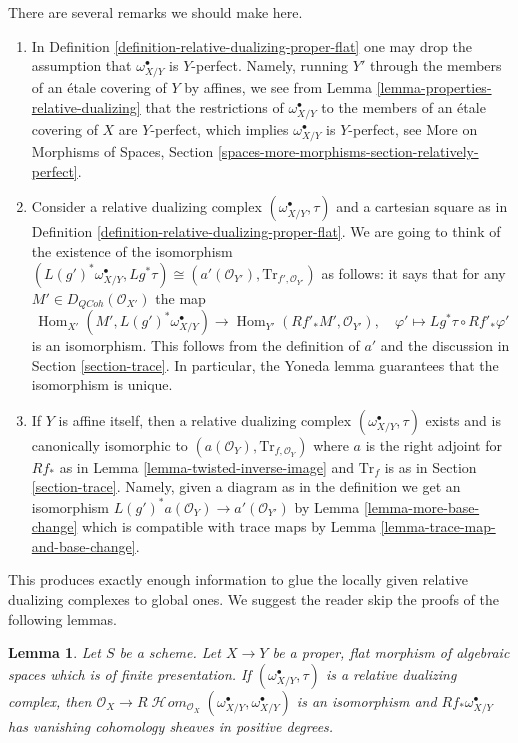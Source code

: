 \documentclass{stacks-project}
\theoremstyle{plain}
\newtheorem{lemma}[subsection]{Lemma}
\theoremstyle{definition}
\theoremstyle{remark}
\numberwithin{equation}{subsection}
\def\Hom{\mathop{\mathrm{Hom}}\nolimits}
\def\SheafHom{\mathop{\mathcal{H}\!\mathit{om}}\nolimits}
\def\QCoh{\mathit{QCoh}}
\begin{document}
\noindent
There are several remarks we should make here.
\begin{enumerate}
\item In Definition \ref{definition-relative-dualizing-proper-flat}
one may drop the assumption that $\omega_{X/Y}^\bullet$ is $Y$-perfect.
Namely, running $Y'$ through the members of an \'etale covering of $Y$
by affines, we see from Lemma \ref{lemma-properties-relative-dualizing}
that the restrictions of $\omega_{X/Y}^\bullet$ to the members of
an \'etale covering of $X$ are $Y$-perfect, which implies
$\omega_{X/Y}^\bullet$ is $Y$-perfect, see
More on Morphisms of Spaces, Section
\ref{spaces-more-morphisms-section-relatively-perfect}.
\item Consider a relative dualizing complex
$(\omega_{X/Y}^\bullet, \tau)$ and a cartesian square as in
Definition \ref{definition-relative-dualizing-proper-flat}.
We are going to think of the existence of the isomorphism
$(L(g')^*\omega_{X/Y}^\bullet, Lg^*\tau) \cong
(a'(\mathcal{O}_{Y'}), \text{Tr}_{f', \mathcal{O}_{Y'}})$
as follows: it says that for any $M' \in D_\QCoh(\mathcal{O}_{X'})$
the map
$$
\Hom_{X'}(M', L(g')^*\omega_{X/Y}^\bullet)
\longrightarrow
\Hom_{Y'}(Rf'_*M', \mathcal{O}_{Y'}),\quad
\varphi' \longmapsto Lg^*\tau \circ Rf'_*\varphi'
$$
is an isomorphism. This follows from the definition of $a'$
and the discussion in Section \ref{section-trace}. In particular,
the Yoneda lemma guarantees that the isomorphism is unique.
\item If $Y$ is affine itself, then a relative dualizing complex
$(\omega_{X/Y}^\bullet, \tau)$ exists and is canonically isomorphic
to $(a(\mathcal{O}_Y), \text{Tr}_{f, \mathcal{O}_Y})$ where
$a$ is the right adjoint for $Rf_*$ as in
Lemma \ref{lemma-twisted-inverse-image}
and $\text{Tr}_f$ is as in Section \ref{section-trace}.
Namely, given a diagram as in the definition we get
an isomorphism $L(g')^*a(\mathcal{O}_Y) \to a'(\mathcal{O}_{Y'})$ by
Lemma \ref{lemma-more-base-change}
which is compatible with trace maps by
Lemma \ref{lemma-trace-map-and-base-change}.
\end{enumerate}
This produces exactly enough information to glue the locally given
relative dualizing complexes to global ones. We suggest the reader
skip the proofs of the following lemmas.

\begin{lemma}
\label{lemma-relative-dualizing-RHom}
Let $S$ be a scheme. Let $X \to Y$ be a proper, flat morphism of
algebraic spaces which is of finite presentation.
If $(\omega_{X/Y}^\bullet, \tau)$ is a relative dualizing complex,
then  $\mathcal{O}_X \to
R\SheafHom_{\mathcal{O}_X}(\omega_{X/Y}^\bullet, \omega_{X/Y}^\bullet)$
is an isomorphism and $Rf_*\omega_{X/Y}^\bullet$ has vanishing cohomology
sheaves in positive degrees.
\end{lemma}
\end{document}
